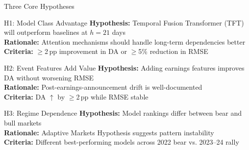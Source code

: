 \documentclass[aspectratio=169,xcolor={dvipsnames}]{beamer}
\begin{document}
\begin{frame}{Three Core Hypotheses}
  \begin{block}{H1: Model Class Advantage}
    \textbf{Hypothesis:} Temporal Fusion Transformer (TFT) will outperform baselines at $h=21$ days\\
    \textbf{Rationale:} Attention mechanisms should handle long-term dependencies better\\
    \textbf{Criteria:} $\geq$2\,pp improvement in DA or $\geq$5\% reduction in RMSE
  \end{block}
  
  \begin{block}{H2: Event Features Add Value}
    \textbf{Hypothesis:} Adding earnings features improves DA without worsening RMSE\\
    \textbf{Rationale:} Post-earnings-announcement drift is well-documented\\
    \textbf{Criteria:} DA $\uparrow$ by $\geq$2\,pp while RMSE stable
  \end{block}
  
  \begin{block}{H3: Regime Dependence}
    \textbf{Hypothesis:} Model rankings differ between bear and bull markets\\
    \textbf{Rationale:} Adaptive Markets Hypothesis suggests pattern instability\\
    \textbf{Criteria:} Different best-performing models across 2022 bear vs. 2023--24 rally
  \end{block}
\end{frame}
\end{document}
